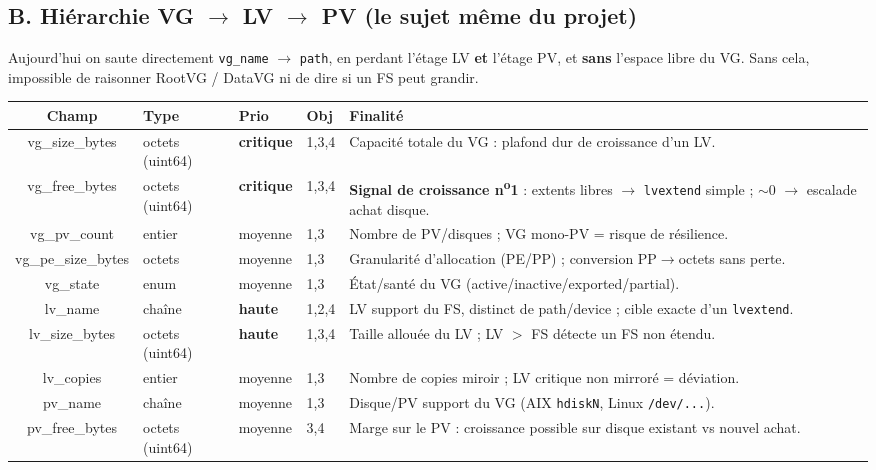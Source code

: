 \documentclass[11pt,a4paper]{article}
\newcommand{\pCrit}{\textcolor{cBlock}{\textbf{critique}}}
\newcommand{\pHigh}{\textcolor{cHigh}{\textbf{haute}}}
\newcommand{\pMed}{\textcolor{cMed}{moyenne}}
\newcommand{\code}[1]{\texttt{#1}}
\begin{document}
\subsection{B. Hi\'erarchie VG $\rightarrow$ LV $\rightarrow$ PV (le sujet m\^eme du projet)}

Aujourd'hui on saute directement \code{vg\_name} $\rightarrow$ \code{path}, en perdant l'\'etage LV
\textbf{et} l'\'etage PV, et \textbf{sans} l'espace libre du VG. Sans cela, impossible de raisonner
\og RootVG / DataVG\fg{} ni de dire si un FS peut grandir.

\begin{center}
\begin{longtable}{C T O O F}
\toprule
\textbf{\normalfont Champ} & \textbf{\normalfont Type} & \textbf{\normalfont Prio} & \textbf{\normalfont Obj} & \textbf{\normalfont Finalit\'e} \\
\midrule
\endhead
vg\_size\_bytes & octets (uint64) & \pCrit & 1,3,4 & Capacit\'e totale du VG : plafond dur de croissance d'un LV. \\
vg\_free\_bytes & octets (uint64) & \pCrit & 1,3,4 & \textbf{Signal de croissance n\textsuperscript{o}1} : extents libres $\rightarrow$ \code{lvextend} simple ; $\sim$0 $\rightarrow$ escalade achat disque. \\
vg\_pv\_count & entier & \pMed & 1,3 & Nombre de PV/disques ; VG mono-PV = risque de r\'esilience. \\
vg\_pe\_size\_bytes & octets & \pMed & 1,3 & Granularit\'e d'allocation (PE/PP) ; conversion PP$\rightarrow$octets sans perte. \\
vg\_state & enum & \pMed & 1,3 & \'Etat/sant\'e du VG (active/inactive/exported/partial). \\
lv\_name & cha\^ine & \pHigh & 1,2,4 & LV support du FS, distinct de path/device ; cible exacte d'un \code{lvextend}. \\
lv\_size\_bytes & octets (uint64) & \pHigh & 1,3,4 & Taille allou\'ee du LV ; LV $>$ FS d\'etecte un FS non \'etendu. \\
lv\_copies & entier & \pMed & 1,3 & Nombre de copies miroir ; LV critique non mirror\'e = d\'eviation. \\
pv\_name & cha\^ine & \pMed & 1,3 & Disque/PV support du VG (AIX \code{hdiskN}, Linux \code{/dev/...}). \\
pv\_free\_bytes & octets (uint64) & \pMed & 3,4 & Marge sur le PV : croissance possible sur disque existant vs nouvel achat. \\

\end{longtable}
\end{center}
\end{document}
